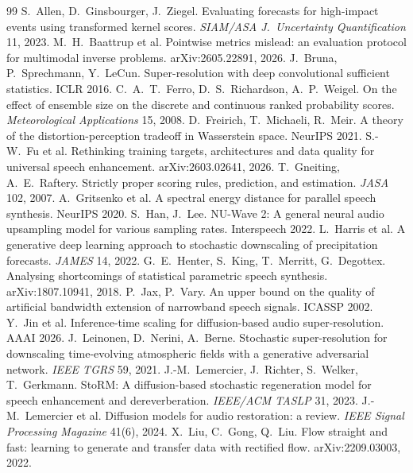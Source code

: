 \documentclass[10pt,letterpaper]{article}
\begin{document}
\begin{thebibliography}{99}\small
{} S.~Allen, D.~Ginsbourger, J.~Ziegel. Evaluating forecasts for high-impact events using transformed kernel scores. \emph{SIAM/ASA J.\ Uncertainty Quantification} 11, 2023.
 M.~H.~Baattrup et al. Pointwise metrics mislead: an evaluation protocol for multimodal inverse problems. arXiv:2605.22891, 2026.
 J.~Bruna, P.~Sprechmann, Y.~LeCun. Super-resolution with deep convolutional sufficient statistics. ICLR 2016.
 C.~A.~T.~Ferro, D.~S.~Richardson, A.~P.~Weigel. On the effect of ensemble size on the discrete and continuous ranked probability scores. \emph{Meteorological Applications} 15, 2008.
 D.~Freirich, T.~Michaeli, R.~Meir. A theory of the distortion-perception tradeoff in Wasserstein space. NeurIPS 2021.
 S.-W.~Fu et al. Rethinking training targets, architectures and data quality for universal speech enhancement. arXiv:2603.02641, 2026.
 T.~Gneiting, A.~E.~Raftery. Strictly proper scoring rules, prediction, and estimation. \emph{JASA} 102, 2007.
 A.~Gritsenko et al. A spectral energy distance for parallel speech synthesis. NeurIPS 2020.
 S.~Han, J.~Lee. NU-Wave 2: A general neural audio upsampling model for various sampling rates. Interspeech 2022.
 L.~Harris et al. A generative deep learning approach to stochastic downscaling of precipitation forecasts. \emph{JAMES} 14, 2022.
 G.~E.~Henter, S.~King, T.~Merritt, G.~Degottex. Analysing shortcomings of statistical parametric speech synthesis. arXiv:1807.10941, 2018.
 P.~Jax, P.~Vary. An upper bound on the quality of artificial bandwidth extension of narrowband speech signals. ICASSP 2002.
 Y.~Jin et al. Inference-time scaling for diffusion-based audio super-resolution. AAAI 2026.
 J.~Leinonen, D.~Nerini, A.~Berne. Stochastic super-resolution for downscaling time-evolving atmospheric fields with a generative adversarial network. \emph{IEEE TGRS} 59, 2021.
 J.-M.~Lemercier, J.~Richter, S.~Welker, T.~Gerkmann. StoRM: A diffusion-based stochastic regeneration model for speech enhancement and dereverberation. \emph{IEEE/ACM TASLP} 31, 2023.
 J.-M.~Lemercier et al. Diffusion models for audio restoration: a review. \emph{IEEE Signal Processing Magazine} 41(6), 2024.
 X.~Liu, C.~Gong, Q.~Liu. Flow straight and fast: learning to generate and transfer data with rectified flow. arXiv:2209.03003, 2022.

\end{thebibliography}
\end{document}
